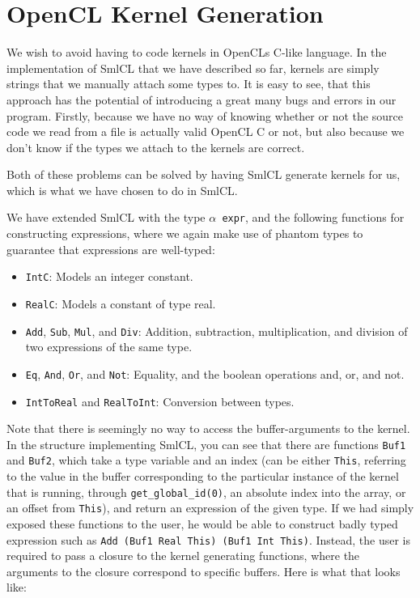 \section{OpenCL Kernel Generation}

We wish to avoid having to code kernels in OpenCLs C-like language. In
the implementation of SmlCL that we have described so far, kernels are
simply strings that we manually attach some types to. It is easy to
see, that this approach has the potential of introducing a great many
bugs and errors in our program. Firstly, because we have no way of
knowing whether or not the source code we read from a file is actually
valid OpenCL C or not, but also because we don't know if the types
we attach to the kernels are correct.

Both of these problems can be solved by having SmlCL generate kernels
for us, which is what we have chosen to do in SmlCL.

We have extended SmlCL with the type \texttt{$\alpha$ expr}, and the
following functions for constructing expressions, where we again make
use of phantom types to guarantee that expressions are well-typed:

\begin{itemize}
  \item \texttt{IntC}: Models an integer constant.
  \item \texttt{RealC}: Models a constant of type real.
  \item \texttt{Add}, \texttt{Sub}, \texttt{Mul}, and \texttt{Div}:
    Addition, subtraction, multiplication, and division of two expressions of the same type.
  \item \texttt{Eq}, \texttt{And}, \texttt{Or}, and \texttt{Not}:
    Equality, and the boolean operations and, or, and not.
  \item \texttt{IntToReal} and \texttt{RealToInt}: Conversion between
    types.
\end{itemize}

Note that there is seemingly no way to access the buffer-arguments to
the kernel. In the structure implementing SmlCL, you can see that
there are functions \texttt{Buf1} and
\texttt{Buf2}, which take a type variable and an index (can be either
\texttt{This}, referring to the value in the buffer corresponding to
the particular instance of the kernel that is running, through
\texttt{get\_global\_id(0)}, an absolute index into the array, or an
offset from \texttt{This}), and return an expression of the given
type. If we had simply exposed these functions to the user, he would
be able to construct badly typed expression such as \texttt{Add (Buf1
  Real This) (Buf1 Int This)}. Instead, the user is required to pass a
closure to the kernel generating functions, where the arguments to the
closure correspond to specific buffers. Here is what that looks
like:

